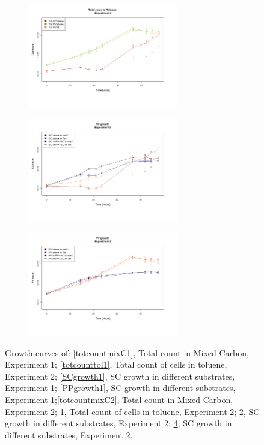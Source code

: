 \documentclass[a4paper, 10pt, conference]{ieeeconf}   %
\begin{document}
\begin{landscape}
\begin{figure}
\begin{subfigure}{.35\textheight}
			\includegraphics[width=6.5cm]{totcount_tol2.png}
			\caption{}
			\label{totcounttol2}
		\end{subfigure}%
		\begin{subfigure}{.35\textheight}
			\centering
			\vspace{-0cm}	
			\includegraphics[width=6.5cm]{SCgrowth2.png}
			\caption{}
			\label{SCgrowth2}
		\end{subfigure}%
		\begin{subfigure}{.35\textheight}
			\centering
			\vspace{-0cm}
			\includegraphics[width=6.5cm]{PVgrowth2.png}
			\caption{}
			\label{PVgrowth2}
		\end{subfigure}
		
		\caption{ Growth curves of: \ref{totcountmixC1}, Total count in Mixed Carbon, Experiment 1; \ref{totcounttol1}, Total count of cells in toluene, Experiment 2; \ref{SCgrowth1}, SC growth in different substrates, Experiment 1; \ref{PPgrowth1}, SC growth in different substrates, Experiment 1;\ref{totcountmixC2}, Total count in Mixed Carbon, Experiment 2; \ref{totcounttol2}, Total count of cells in toluene, Experiment 2; \ref{SCgrowth2}, SC growth in different substrates, Experiment 2; \ref{PVgrowth2}, SC growth in different substrates, Experiment 2.}
		
		
	\end{figure}
\end{landscape}
\end{document}
